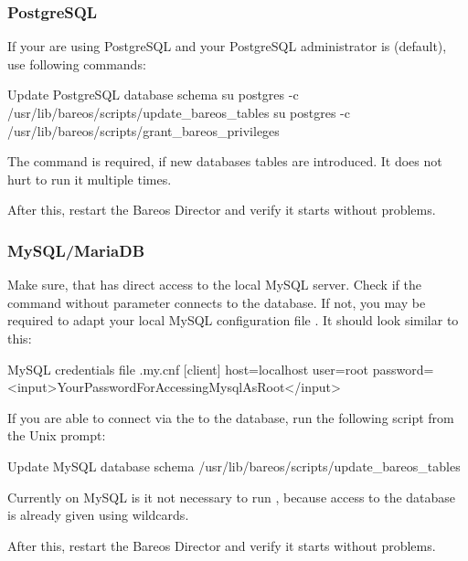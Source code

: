 \subsubsection{PostgreSQL}
If your are using PostgreSQL and your PostgreSQL administrator is  (default), use following commands:

\begin{commands}{Update PostgreSQL database schema}
su postgres -c /usr/lib/bareos/scripts/update_bareos_tables
su postgres -c /usr/lib/bareos/scripts/grant_bareos_privileges
\end{commands}

The  command is required, if new databases tables are introduced. It does not hurt to run it multiple times.

After this, restart the Bareos Director and verify it starts without problems.

\subsubsection{MySQL/MariaDB}
Make sure, that  has direct access to the local MySQL server.
Check if the command  without parameter connects to the database.
If not, you may be required to adapt your local MySQL configuration file .
It should look similar to this:

\begin{config}{MySQL credentials file .my.cnf}
[client]
host=localhost
user=root
password=<input>YourPasswordForAccessingMysqlAsRoot</input>
\end{config}

If you are able to connect via the  to the database, run the following script from the Unix prompt:
\begin{commands}{Update MySQL database schema}
/usr/lib/bareos/scripts/update_bareos_tables
\end{commands}

Currently on MySQL is it not necessary to run , because access to the database is already given using wildcards.

After this, restart the Bareos Director and verify it starts without problems.
